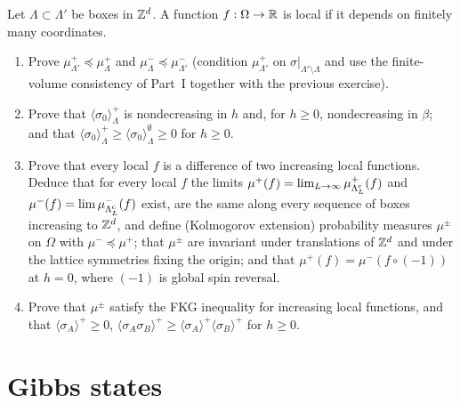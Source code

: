 \begin{exercise}
Let $\Lambda\subset\Lambda'$ be boxes in $\mathbb Z^d$.  A function
$f:\Omega\to\mathbb R$ is local if it depends on finitely many coordinates.
\begin{enumerate}[label=(\alph*)]
\item Prove $\mu^+_{\Lambda'}\preceq\mu^+_\Lambda$ and
$\mu^-_\Lambda\preceq\mu^-_{\Lambda'}$ (condition $\mu^+_{\Lambda'}$ on
$\sigma|_{\Lambda'\setminus\Lambda}$ and use the finite-volume consistency of
Part~I together with the previous exercise).
\item Prove that $\langle\sigma_0\rangle^+_\Lambda$ is nondecreasing in $h$
and, for $h\ge0$, nondecreasing in $\beta$; and that
$\langle\sigma_0\rangle^+_\Lambda\ge\langle\sigma_0\rangle^\emptyset_\Lambda\ge0$
for $h\ge0$.
\item Prove that every local $f$ is a difference of two increasing local
functions.  Deduce that for every local $f$ the limits
$\mu^+(f)=\lim_{L\to\infty}\mu^+_{\Lambda_L^{\rm c}}(f)$ and $\mu^-(f)=\lim\mu^-_{\Lambda_L^{\rm c}}(f)$
exist, are the same along every sequence of boxes increasing to $\mathbb Z^d$, and
define (Kolmogorov extension) probability measures $\mu^\pm$ on $\Omega$ with
$\mu^-\preceq\mu^+$; that $\mu^\pm$ are invariant under translations of $\mathbb Z^d$
and under the lattice symmetries fixing the origin; and that
$\mu^+(f)=\mu^-(f\circ(-1))$ at $h=0$, where $(-1)$ is global spin reversal.
\item Prove that $\mu^\pm$ satisfy the FKG inequality for increasing local
functions, and that $\langle\sigma_A\rangle^+\ge0$,
$\langle\sigma_A\sigma_B\rangle^+\ge\langle\sigma_A\rangle^+\langle\sigma_B\rangle^+$
for $h\ge0$.
\end{enumerate}
\end{exercise}

\section{Gibbs states}

